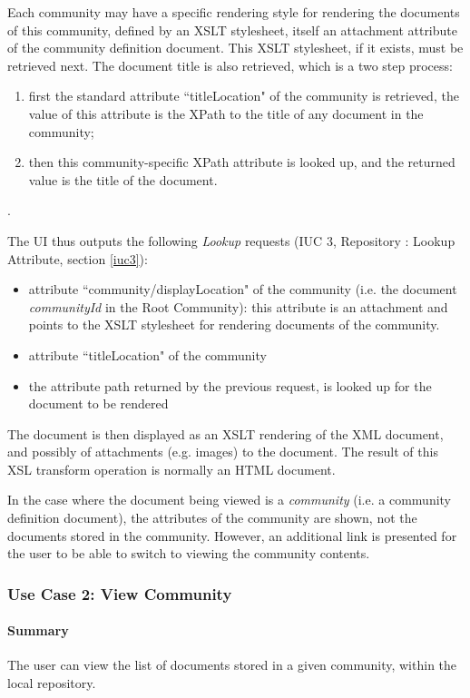 \documentclass[titlepage]{article}%
\begin{document}
Each community may have a specific rendering style for rendering the documents of this community, defined by an XSLT stylesheet, itself an attachment attribute of the community definition document. This XSLT stylesheet, if it exists, must be retrieved next. The document title is also retrieved, which is a two step process: 
	   \begin{enumerate}
	   \item first the standard attribute ``titleLocation" of the community is retrieved, the value of this attribute is the XPath to the title of any document in the community;
	   \item then this community-specific XPath attribute is looked up, and the returned value is the title of the document.
     \end{enumerate}. 

The UI thus outputs the following \emph{Lookup} requests (IUC 3,  Repository : Lookup Attribute, section \ref{iuc3}):
\begin{itemize}
	\item attribute ``community/displayLocation" of the community (i.e. the document \emph{communityId} in the Root Community): this attribute is an attachment and points to the XSLT stylesheet for rendering documents of the community.
  \item attribute ``titleLocation" of the community 
	\item the attribute path returned by the previous request, is looked up for the document to be rendered
\end{itemize} 

The document is then displayed as an XSLT rendering of the XML document, and possibly of attachments (e.g. images) to the document. The result of this XSL transform operation is normally an HTML document.

In the case where the document being viewed is a \emph{community} (i.e. a community definition document), the attributes of the community are shown, not the documents stored in the community. However, an additional link is presented for the user to be able to switch to viewing the community contents.
\subsubsection{Use Case 2: View Community}
\label{uc2}

\paragraph{Summary}
The user can view the list of documents stored in a given community, within the local repository. 
\end{document}

